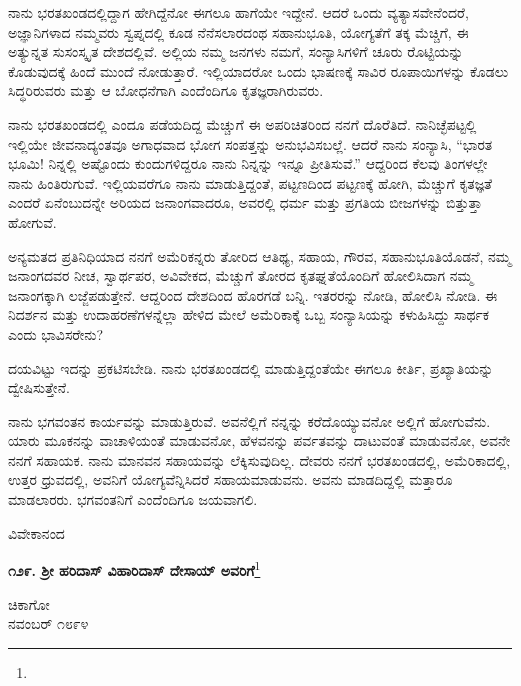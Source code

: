 ನಾನು ಭರತಖಂಡದಲ್ಲಿದ್ದಾಗ ಹೇಗಿದ್ದೆನೋ ಈಗಲೂ ಹಾಗೆಯೇ ಇದ್ದೇನೆ. ಆದರೆ ಒಂದು ವ್ಯತ್ಯಾಸವೇನೆಂದರೆ, ಅಜ್ಞಾನಿಗಳಾದ ನಮ್ಮವರು ಸ್ವಪ್ನದಲ್ಲಿ ಕೂಡ ನೆನೆಸಲಾರದಂಥ ಸಹಾನುಭೂತಿ, ಯೋಗ್ಯತೆಗೆ ತಕ್ಕ ಮೆಚ್ಚಿಗೆ, ಈ ಅತ್ಯುನ್ನತ ಸುಸಂಸ್ಕೃತ ದೇಶದಲ್ಲಿವೆ. ಅಲ್ಲಿಯ ನಮ್ಮ ಜನಗಳು ನಮಗೆ, ಸಂನ್ಯಾಸಿಗಳಿಗೆ ಚೂರು ರೊಟ್ಟಿಯನ್ನು ಕೊಡುವುದಕ್ಕೆ ಹಿಂದೆ ಮುಂದೆ ನೋಡುತ್ತಾರೆ. ಇಲ್ಲಿಯಾದರೋ ಒಂದು ಭಾಷಣಕ್ಕೆ ಸಾವಿರ ರೂಪಾಯಿಗಳನ್ನು ಕೊಡಲು ಸಿದ್ಧರಿರುವರು ಮತ್ತು ಆ ಬೋಧನೆಗಾಗಿ ಎಂದೆಂದಿಗೂ ಕೃತಜ್ಞರಾಗಿರುವರು.

ನಾನು ಭರತಖಂಡದಲ್ಲಿ ಎಂದೂ ಪಡೆಯದಿದ್ದ ಮೆಚ್ಚುಗೆ ಈ ಅಪರಿಚಿತರಿಂದ ನನಗೆ ದೊರೆತಿದೆ. ನಾನಿಚ್ಛೆಪಟ್ಟಲ್ಲಿ ಇಲ್ಲಿಯೇ ಜೀವನಾದ್ಯಂತವೂ ಅಗಾಧವಾದ ಭೋಗ ಸಂಪತ್ತನ್ನು ಅನುಭವಿಸಬಲ್ಲೆ. ಆದರೆ ನಾನು ಸಂನ್ಯಾಸಿ, “ಭಾರತ ಭೂಮಿ! ನಿನ್ನಲ್ಲಿ ಅಷ್ಟೊಂದು ಕುಂದುಗಳಿದ್ದರೂ ನಾನು ನಿನ್ನನ್ನು ಇನ್ನೂ ಪ್ರೀತಿಸುವೆ.'' ಆದ್ದರಿಂದ ಕೆಲವು ತಿಂಗಳಲ್ಲೇ ನಾನು ಹಿಂತಿರುಗುವೆ. ಇಲ್ಲಿಯವರೆಗೂ ನಾನು ಮಾಡುತ್ತಿದ್ದಂತೆ, ಪಟ್ಟಣದಿಂದ ಪಟ್ಟಣಕ್ಕೆ ಹೋಗಿ, ಮೆಚ್ಚುಗೆ ಕೃತಜ್ಞತೆ ಎಂದರೆ ಏನೆಂಬುದನ್ನೇ ಅರಿಯದ ಜನಾಂಗವಾದರೂ, ಅವರಲ್ಲಿ ಧರ್ಮ ಮತ್ತು ಪ್ರಗತಿಯ ಬೀಜಗಳನ್ನು ಬಿತ್ತುತ್ತಾ ಹೋಗುವೆ.

ಅನ್ಯಮತದ ಪ್ರತಿನಿಧಿಯಾದ ನನಗೆ ಅಮೆರಿಕನ್ನರು ತೋರಿದ ಆತಿಥ್ಯ, ಸಹಾಯ, ಗೌರವ, ಸಹಾನುಭೂತಿಯೊಡನೆ, ನಮ್ಮ ಜನಾಂಗದವರ ನೀಚ, ಸ್ವಾರ್ಥಪರ, ಅವಿವೇಕದ, ಮೆಚ್ಚುಗೆ ತೋರದ ಕೃತಘ್ನತೆಯೊಂದಿಗೆ ಹೋಲಿಸಿದಾಗ ನಮ್ಮ ಜನಾಂಗಕ್ಕಾಗಿ ಲಜ್ಜೆಪಡುತ್ತೇನೆ. ಆದ್ದರಿಂದ ದೇಶದಿಂದ ಹೊರಗಡೆ ಬನ್ನಿ. ಇತರರನ್ನು ನೋಡಿ, ಹೋಲಿಸಿ ನೋಡಿ. ಈ ನಿದರ್ಶನ ಮತ್ತು ಉದಾಹರಣೆಗಳನ್ನೆಲ್ಲಾ ಹೇಳಿದ ಮೇಲೆ ಅಮೆರಿಕಾಕ್ಕೆ ಒಬ್ಬ ಸಂನ್ಯಾಸಿಯನ್ನು ಕಳುಹಿಸಿದ್ದು ಸಾರ್ಥಕ ಎಂದು ಭಾವಿಸರೇನು?

\newpage

ದಯವಿಟ್ಟು ಇದನ್ನು ಪ್ರಕಟಿಸಬೇಡಿ. ನಾನು ಭರತಖಂಡದಲ್ಲಿ ಮಾಡುತ್ತಿದ್ದಂತೆಯೇ ಈಗಲೂ ಕೀರ್ತಿ, ಪ್ರಖ್ಯಾತಿಯನ್ನು ದ್ವೇಷಿಸುತ್ತೇನೆ.

ನಾನು ಭಗವಂತನ ಕಾರ್ಯವನ್ನು ಮಾಡುತ್ತಿರುವೆ. ಅವನೆಲ್ಲಿಗೆ ನನ್ನನ್ನು ಕರೆದೊಯ್ಯು\break ವನೋ ಅಲ್ಲಿಗೆ ಹೋಗುವೆನು. ಯಾರು ಮೂಕನನ್ನು ವಾಚಾಳಿಯಂತೆ ಮಾಡುವನೋ, ಹೆಳವನನ್ನು ಪರ್ವತವನ್ನು ದಾಟುವಂತೆ ಮಾಡುವನೋ, ಅವನೇ ನನಗೆ ಸಹಾಯಕ. ನಾನು ಮಾನವನ ಸಹಾಯವನ್ನು ಲೆಕ್ಕಿಸುವುದಿಲ್ಲ. ದೇವರು ನನಗೆ ಭರತಖಂಡದಲ್ಲಿ, ಅಮೆರಿಕಾದಲ್ಲಿ, ಉತ್ತರ ಧ್ರುವದಲ್ಲಿ, ಅವನಿಗೆ ಯೋಗ್ಯವೆನ್ನಿಸಿದರೆ ಸಹಾಯಮಾಡುವನು. ಅವನು ಮಾಡದಿದ್ದಲ್ಲಿ ಮತ್ತಾರೂ ಮಾಡಲಾರರು. ಭಗವಂತನಿಗೆ ಎಂದೆಂದಿಗೂ ಜಯವಾಗಲಿ.

\vspace{-0.5cm}

{\flushright
ವಿವೇಕಾನಂದ\par}

\begin{center}
\textbf{೧೨೯. ಶ‍್ರೀ ಹರಿದಾಸ್ ವಿಹಾರಿದಾಸ್ ದೇಸಾಯ್ ಅವರಿಗೆ}\footnote{}
\end{center}

\vspace{-0.5cm}

\begin{flushright}
ಚಿಕಾಗೋ\\ನವಂಬರ್ ೧೮೯೪
\end{flushright}


